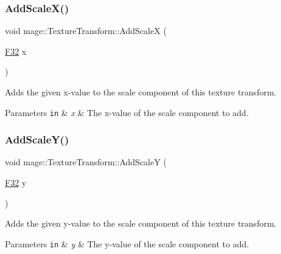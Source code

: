 \subsubsection{\texorpdfstring{Add\+Scale\+X()}{AddScaleX()}}
{\footnotesize\ttfamily void mage\+::\+Texture\+Transform\+::\+Add\+ScaleX (\begin{DoxyParamCaption}\item[{\hyperlink{namespacemage_aa97e833b45f06d60a0a9c4fc22ae02c0}{F32}}]{x }\end{DoxyParamCaption})\hspace{0.3cm}{\ttfamily [noexcept]}}

Adds the given x-\/value to the scale component of this texture transform.


\begin{DoxyParams}[1]{Parameters}
\mbox{\tt in}  & {\em x} & The x-\/value of the scale component to add. \\
\hline
\end{DoxyParams}
\hypertarget{classmage_1_1_texture_transform_a48d0a0ebd014f3fd3d8f30c750763273}{}\label{classmage_1_1_texture_transform_a48d0a0ebd014f3fd3d8f30c750763273} 
\subsubsection{\texorpdfstring{Add\+Scale\+Y()}{AddScaleY()}}
{\footnotesize\ttfamily void mage\+::\+Texture\+Transform\+::\+Add\+ScaleY (\begin{DoxyParamCaption}\item[{\hyperlink{namespacemage_aa97e833b45f06d60a0a9c4fc22ae02c0}{F32}}]{y }\end{DoxyParamCaption})\hspace{0.3cm}{\ttfamily [noexcept]}}

Adds the given y-\/value to the scale component of this texture transform.


\begin{DoxyParams}[1]{Parameters}
\mbox{\tt in}  & {\em y} & The y-\/value of the scale component to add. \\
\hline
\end{DoxyParams}
\hypertarget{classmage_1_1_texture_transform_a759b5363ddc7621b422ebdc90c9e17af}{}\label{classmage_1_1_texture_transform_a759b5363ddc7621b422ebdc90c9e17af} 

